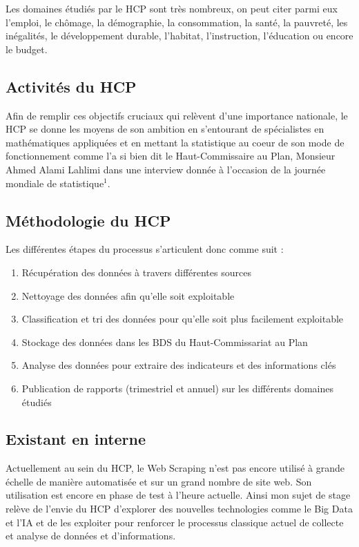 \documentclass[a4paper,french,12pt]{article}
\begin{document}
Les domaines étudiés par le HCP sont très nombreux, on peut citer parmi eux l'emploi, le chômage, la démographie, la consommation, la santé, la pauvreté, les inégalités, le développement durable, l'habitat, l'instruction, l'éducation ou encore le budget.

\subsection{Activités du HCP}

Afin de remplir ces objectifs cruciaux qui relèvent d'une importance nationale, le HCP se donne les moyens de son ambition en s'entourant de spécialistes en mathématiques appliquées et en mettant la statistique au coeur de son mode de fonctionnement comme l'a si bien dit le Haut-Commissaire au Plan, Monsieur Ahmed Alami Lahlimi dans une interview donnée à l'occasion de la journée mondiale de statistique\href{https://www.hcp.ma/Entretien-accorde-par-Monsieur-le-Haut-Commissaire-au-Plan-a-la-MAP-a-l-occasion-de-la-Journee-Mondiale-de-la_a2606.html}{$^1$}.

\subsection{Méthodologie du HCP}

\noindent
Les différentes étapes du processus s'articulent donc comme suit :\\
\begin{enumerate}
    \item Récupération des données à travers différentes sources
    \item Nettoyage des données afin qu'elle soit exploitable
    \item Classification et tri des données pour qu'elle soit plus facilement exploitable
    \item Stockage des données dans les BDS du Haut-Commissariat au Plan
    \item Analyse des données pour extraire des indicateurs et des informations clés
    \item Publication de rapports (trimestriel et annuel) sur les différents domaines étudiés 
\end{enumerate}

\subsection{Existant en interne}

Actuellement au sein du HCP, le Web Scraping n'est pas encore utilisé à grande échelle de manière automatisée et sur un grand nombre de site web. Son utilisation est encore en phase de test à l'heure actuelle. Ainsi mon sujet de stage relève de l'envie du HCP d'explorer des nouvelles technologies comme le Big Data et l'IA et de les exploiter pour renforcer le processus classique actuel de collecte et analyse de données et d'informations.\\
\end{document}
